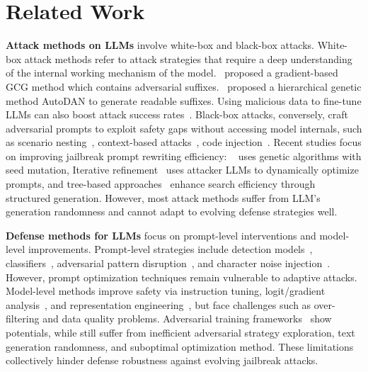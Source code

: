 \documentclass[11pt]{article}
\begin{document}
\section{Related Work}
\textbf{Attack methods on LLMs} involve white-box and black-box attacks. White-box attack methods refer to attack strategies that require a deep understanding of the internal working mechanism of the model.~\citet{GCG} proposed a gradient-based GCG method which contains adversarial suffixes.~\citet{AutoDAN} proposed a hierarchical genetic method AutoDAN to generate readable suffixes. Using malicious data to fine-tune LLMs can also boost attack success rates~\citep{finetuneharm}. Black-box attacks, conversely, craft adversarial prompts to exploit safety gaps without accessing model internals, such as scenario nesting~\citep{ReNeLLM}, context-based attacks~\citep{zheng2024improved}, code injection~\citep{codeattack}. Recent studies focus on improving jailbreak prompt rewriting efficiency: ~\citet{gptfuzzer} uses genetic algorithms with seed mutation, Iterative refinement~\citep{PAIR} uses attacker LLMs to dynamically optimize prompts, and tree-based approaches~\citep{TAP,MPA} enhance search efficiency through structured generation. However, most attack methods suffer from LLM's generation randomness and cannot adapt to evolving defense strategies well.
 

\noindent\textbf{Defense methods for LLMs} focus on prompt-level interventions and model-level improvements. Prompt-level strategies include detection models~\citep{PPL}, classifiers~\citep{llamaguard}, adversarial pattern disruption~\citep{RALLM}, and character noise injection~\citep{smoothllm}. However, prompt optimization techniques remain vulnerable to adaptive attacks. Model-level methods improve safety via instruction tuning, logit/gradient analysis~\citep{safeRLHF}, and representation engineering~\citep{mazeika2024harmbench,LAT}, but face challenges such as over-filtering and data quality problems. Adversarial training frameworks~\citep{ICAG,MART,wang2025lifelong} show potentials, while still suffer from inefficient adversarial strategy exploration, text generation randomness, and suboptimal optimization method. These limitations collectively hinder defense robustness against evolving jailbreak attacks.

 


 
\end{document}
